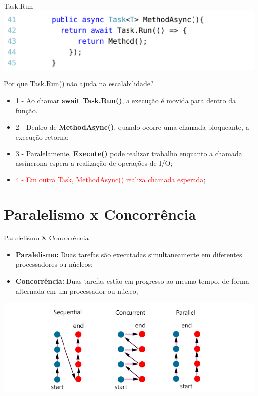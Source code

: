 \documentclass[10pt]{beamer}
\begin{document}
\begin{frame}{Task.Run}
	\includegraphics[scale=0.27]{imgs/02-syncToAsync.png}	
	\vspace{0.1cm}
	
	\begin{alertblock}{Por que Task.Run() não ajuda na escalabilidade?}
		\begin{itemize}
			\item 1 - Ao chamar \textbf{await Task.Run()}, a execução é movida para dentro da função.
			\item 2 - Dentro de \textbf{MethodAsync()}, quando ocorre uma chamada bloqueante, a execução retorna;
			\item 3 - Paralelamente, \textbf{Execute()} pode realizar trabalho enquanto a chamada assíncrona espera a realização de operações de I/O;
			\item \textcolor{red}{4 - Em outra Task, MethodAsync() realiza chamada esperada};
		\end{itemize}
	\end{alertblock}
\end{frame}


\section{Paralelismo x Concorrência}

\begin{frame}{Paralelismo X Concorrência}
	\begin{itemize}
		\item \textbf{Paralelismo:} Duas tarefas são executadas simultaneamente em diferentes processadores ou núcleos;
		\vspace{0.2cm}
		\item \textbf{Concorrência:} Duas tarefas estão em progresso ao mesmo tempo, de forma alternada em um processador ou núcleo;
	\end{itemize}
	\includegraphics[width=\textwidth]{imgs/compare}
\end{frame}
\end{document}
